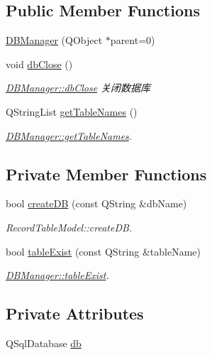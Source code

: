\subsection*{Public Member Functions}
\begin{DoxyCompactItemize}
\item 
\mbox{\hyperlink{class_d_b_manager_a96ceb14668a63d2b99e0b01c708776bb}{D\+B\+Manager}} (Q\+Object $\ast$parent=0)
\item 
void \mbox{\hyperlink{class_d_b_manager_abe9b0e3d863e27668b62a7fa43227fa5}{db\+Close}} ()
\begin{DoxyCompactList}\small\item\em \mbox{\hyperlink{class_d_b_manager_abe9b0e3d863e27668b62a7fa43227fa5}{D\+B\+Manager\+::db\+Close}} 关闭数据库 \end{DoxyCompactList}\item 
Q\+String\+List \mbox{\hyperlink{class_d_b_manager_a9b85dcef0c0b6481b874982c2eff50b2}{get\+Table\+Names}} ()
\begin{DoxyCompactList}\small\item\em \mbox{\hyperlink{class_d_b_manager_a9b85dcef0c0b6481b874982c2eff50b2}{D\+B\+Manager\+::get\+Table\+Names}}. \end{DoxyCompactList}\end{DoxyCompactItemize}
\subsection*{Private Member Functions}
\begin{DoxyCompactItemize}
\item 
bool \mbox{\hyperlink{class_d_b_manager_a657d030abeeaa632bf2d1a60e04df1e3}{create\+DB}} (const Q\+String \&db\+Name)
\begin{DoxyCompactList}\small\item\em Record\+Table\+Model\+::create\+DB. \end{DoxyCompactList}\item 
bool \mbox{\hyperlink{class_d_b_manager_a95518b4ffbf5b26550b18c7f7d1e471f}{table\+Exist}} (const Q\+String \&table\+Name)
\begin{DoxyCompactList}\small\item\em \mbox{\hyperlink{class_d_b_manager_a95518b4ffbf5b26550b18c7f7d1e471f}{D\+B\+Manager\+::table\+Exist}}. \end{DoxyCompactList}\end{DoxyCompactItemize}
\subsection*{Private Attributes}
\begin{DoxyCompactItemize}
\item 
Q\+Sql\+Database \mbox{\hyperlink{class_d_b_manager_a5399b255096671fc8a5dd3ebf2dd0507}{db}}
\end{DoxyCompactItemize}


